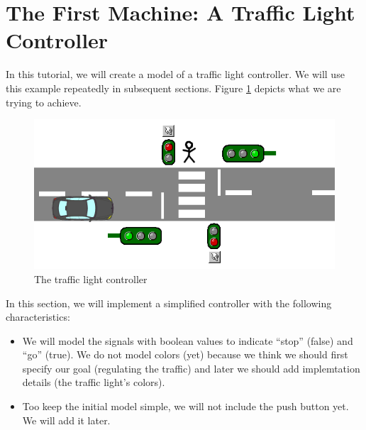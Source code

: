 \section{The First Machine: A Traffic Light Controller}
\label{tut_first_machine}



In this tutorial, we will create a model of a traffic light controller.  We will use this example repeatedly in subsequent sections.  Figure \ref{fig_tut_03_traffic_light} depicts what we are trying to achieve.

\begin{figure}[!ht]
\begin{center}
	\includegraphics[]{img/tutorial/tut_03_trafficlight.png}
	\caption{The traffic light controller}
	\label{fig_tut_03_traffic_light}
\end{center}
\end{figure}

In this section, we will implement a simplified controller with the following characteristics:
\begin{itemize}
	\item We will model the signals with boolean values to indicate ``stop'' (false) and ``go'' (true).  We do not model colors (yet) because
      we think we should first specify our goal (regulating the traffic) and later we should add implemtation details (the traffic light's colors).
	\item Too keep the initial model simple, we will not include the push button yet. We will add it later.
\end{itemize}

